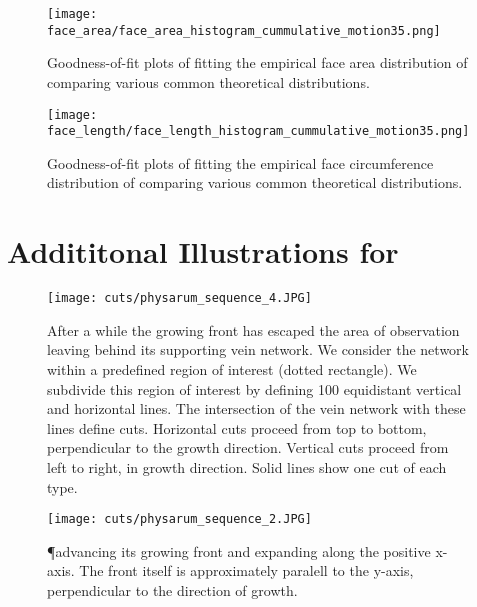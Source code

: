 \begin{figure}[!htbp]
\begin{center}%
  \texttt{[image: face\_area/face\_area\_histogram\_cummulative\_motion35.png]}
\end{center}%
\caption[Goodness-of-fit plots - Face area]{Goodness-of-fit plots of fitting the empirical face area distribution of  comparing various common theoretical distributions.}
\label{fig:sup::face_area_goodness}
\end{figure}

\begin{figure}[!htbp]
\begin{center}%
  \texttt{[image: face\_length/face\_length\_histogram\_cummulative\_motion35.png]}
\end{center}%
\caption[Goodness-of-fit plots - Face circumference]{Goodness-of-fit plots of fitting the empirical face circumference distribution of  comparing various common theoretical distributions.}
\label{fig:sup::face_length_goodness}
\end{figure}

\section{Addititonal Illustrations for }

\vfill
\begin{figure}[!htbp]
\begin{center}%
  \texttt{[image: cuts/physarum\_sequence\_4.JPG]}
\end{center}%
\caption[Horizontal and vertical cuts illustrated]{After a while the growing front has escaped the area of observation leaving behind its supporting vein network. We consider the network within a predefined region of interest (dotted rectangle). We subdivide this region of interest by defining 100 equidistant vertical and horizontal lines. The intersection of the vein network with these lines define cuts. Horizontal cuts proceed from top to bottom, \ie perpendicular to the growth direction. Vertical cuts proceed from left to right, \ie in growth direction. Solid lines show one cut of each type.}
\label{fig:sup::physarum_roi}
\end{figure}
\vfill
\begin{figure}[!htbp]
\begin{center}%
  \texttt{[image: cuts/physarum\_sequence\_2.JPG]}
\end{center}%
\caption[Detail of the apical zone]{\P advancing its growing front and expanding along the positive x-axis. The front itself is approximately paralell to the y-axis, \ie perpendicular to the direction of growth.}
\label{fig:sup::physarum_expanding}
\end{figure}
\vfill

